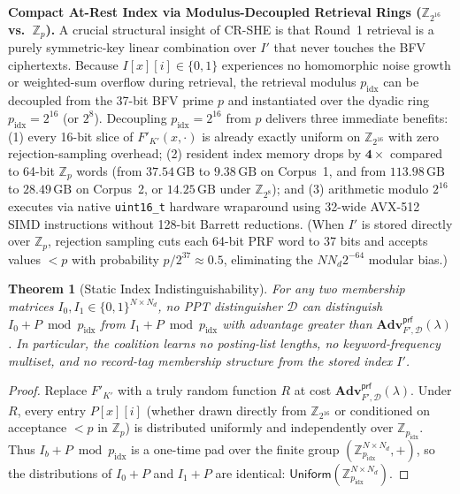 \documentclass[11pt,a4paper]{article}
\newtheorem{theorem}{Theorem}
\begin{document}
\textbf{Compact At-Rest Index via Modulus-Decoupled Retrieval Rings ($\mathbb{Z}_{2^{16}}$ vs.\ $\mathbb{Z}_p$).} A crucial structural insight of CR-SHE is that Round~1 retrieval is a purely symmetric-key linear combination over $I'$ that never touches the BFV ciphertexts. Because $I[x][i] \in \{0,1\}$ experiences no homomorphic noise growth or weighted-sum overflow during retrieval, the retrieval modulus $p_{\mathrm{idx}}$ can be decoupled from the 37-bit BFV prime $p$ and instantiated over the dyadic ring $p_{\mathrm{idx}} = 2^{16}$ (or $2^8$). Decoupling $p_{\mathrm{idx}} = 2^{16}$ from $p$ delivers three immediate benefits: (1) every 16-bit slice of $F'_{K'}(x, \cdot)$ is already exactly uniform on $\mathbb{Z}_{2^{16}}$ with zero rejection-sampling overhead; (2) resident index memory drops by $\mathbf{4\times}$ compared to 64-bit $\mathbb{Z}_p$ words (from $37.54\,\text{GB}$ to $9.38\,\text{GB}$ on Corpus~1, and from $113.98\,\text{GB}$ to $28.49\,\text{GB}$ on Corpus~2, or $14.25\,\text{GB}$ under $\mathbb{Z}_{2^8}$); and (3) arithmetic modulo $2^{16}$ executes via native \texttt{uint16\_t} hardware wraparound using 32-wide AVX-512 SIMD instructions without 128-bit Barrett reductions. (When $I'$ is stored directly over $\mathbb{Z}_p$, rejection sampling cuts each 64-bit PRF word to 37 bits and accepts values $< p$ with probability $p/2^{37} \approx 0.5$, eliminating the $N N_d 2^{-64}$ modular bias.)

\begin{theorem}[Static Index Indistinguishability]\label{thm:mask}
For any two membership matrices $I_0, I_1 \in \{0,1\}^{N \times N_d}$, no PPT distinguisher $\mathcal{D}$ can distinguish $I_0 + P \bmod p_{\mathrm{idx}}$ from $I_1 + P \bmod p_{\mathrm{idx}}$ with advantage greater than $\mathbf{Adv}^{\mathsf{prf}}_{F',\mathcal{D}}(\lambda)$. In particular, the coalition learns no posting-list lengths, no keyword-frequency multiset, and no record-tag membership structure from the stored index $I'$.
\end{theorem}

\begin{proof}
Replace $F'_{K'}$ with a truly random function $R$ at cost $\mathbf{Adv}^{\mathsf{prf}}_{F',\mathcal{D}}(\lambda)$. Under $R$, every entry $P[x][i]$ (whether drawn directly from $\mathbb{Z}_{2^{16}}$ or conditioned on acceptance $< p$ in $\mathbb{Z}_p$) is distributed uniformly and independently over $\mathbb{Z}_{p_{\mathrm{idx}}}$. Thus $I_b + P \bmod p_{\mathrm{idx}}$ is a one-time pad over the finite group $(\mathbb{Z}_{p_{\mathrm{idx}}}^{N \times N_d}, +)$, so the distributions of $I_0 + P$ and $I_1 + P$ are identical: $\mathsf{Uniform}(\mathbb{Z}_{p_{\mathrm{idx}}}^{N \times N_d})$.
\end{proof}
\end{document}
